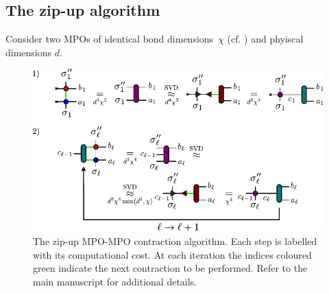 \subsection{The zip-up algorithm}
Consider two MPOs of identical bond dimensions~\(\chi\) (cf. ) and phyiscal dimensions $d$. 
\begin{figure}[ht!]
    \centering
    \includegraphics{figures/ZipUp.pdf}
    \caption{The zip-up MPO-MPO contraction algorithm. Each step is labelled with its computational cost. At each iteration the indices coloured green indicate the next contraction to be performed. Refer to the main manuscript for additional details.}
    \label{fig:zipupalg}
\end{figure}

